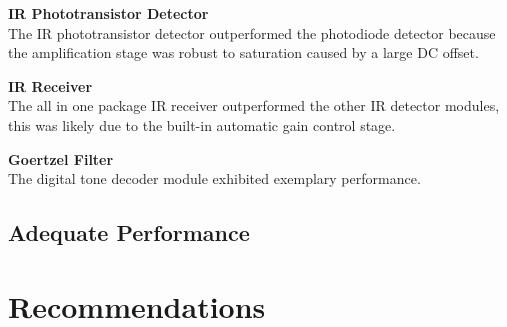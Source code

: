 \textbf{IR Phototransistor Detector}\\
The IR phototransistor detector outperformed the photodiode detector because the amplification stage was robust to saturation caused by a large DC offset.

\textbf{IR Receiver}\\
The all in one package IR receiver outperformed the other IR detector modules, this was likely due to the built-in automatic gain control stage.

\textbf{Goertzel Filter}\\ %
The digital tone decoder module exhibited exemplary performance. %

\subsection{Adequate Performance}





\section{Recommendations}



